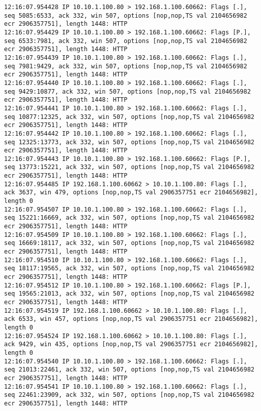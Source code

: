 \documentclass{article}
\begin{document}
{\begin{lstlisting}
12:16:07.954428 IP 10.10.1.100.80 > 192.168.1.100.60662: Flags [.], seq 5085:6533, ack 332, win 507, options [nop,nop,TS val 2104656982 ecr 2906357751], length 1448: HTTP
12:16:07.954429 IP 10.10.1.100.80 > 192.168.1.100.60662: Flags [P.], seq 6533:7981, ack 332, win 507, options [nop,nop,TS val 2104656982 ecr 2906357751], length 1448: HTTP
12:16:07.954439 IP 10.10.1.100.80 > 192.168.1.100.60662: Flags [.], seq 7981:9429, ack 332, win 507, options [nop,nop,TS val 2104656982 ecr 2906357751], length 1448: HTTP
12:16:07.954440 IP 10.10.1.100.80 > 192.168.1.100.60662: Flags [.], seq 9429:10877, ack 332, win 507, options [nop,nop,TS val 2104656982 ecr 2906357751], length 1448: HTTP
12:16:07.954441 IP 10.10.1.100.80 > 192.168.1.100.60662: Flags [.], seq 10877:12325, ack 332, win 507, options [nop,nop,TS val 2104656982 ecr 2906357751], length 1448: HTTP
12:16:07.954442 IP 10.10.1.100.80 > 192.168.1.100.60662: Flags [.], seq 12325:13773, ack 332, win 507, options [nop,nop,TS val 2104656982 ecr 2906357751], length 1448: HTTP
12:16:07.954443 IP 10.10.1.100.80 > 192.168.1.100.60662: Flags [P.], seq 13773:15221, ack 332, win 507, options [nop,nop,TS val 2104656982 ecr 2906357751], length 1448: HTTP
12:16:07.954485 IP 192.168.1.100.60662 > 10.10.1.100.80: Flags [.], ack 3637, win 479, options [nop,nop,TS val 2906357751 ecr 2104656982], length 0
12:16:07.954507 IP 10.10.1.100.80 > 192.168.1.100.60662: Flags [.], seq 15221:16669, ack 332, win 507, options [nop,nop,TS val 2104656982 ecr 2906357751], length 1448: HTTP
12:16:07.954509 IP 10.10.1.100.80 > 192.168.1.100.60662: Flags [.], seq 16669:18117, ack 332, win 507, options [nop,nop,TS val 2104656982 ecr 2906357751], length 1448: HTTP
12:16:07.954510 IP 10.10.1.100.80 > 192.168.1.100.60662: Flags [.], seq 18117:19565, ack 332, win 507, options [nop,nop,TS val 2104656982 ecr 2906357751], length 1448: HTTP
12:16:07.954512 IP 10.10.1.100.80 > 192.168.1.100.60662: Flags [P.], seq 19565:21013, ack 332, win 507, options [nop,nop,TS val 2104656982 ecr 2906357751], length 1448: HTTP
12:16:07.954519 IP 192.168.1.100.60662 > 10.10.1.100.80: Flags [.], ack 6533, win 457, options [nop,nop,TS val 2906357751 ecr 2104656982], length 0
12:16:07.954524 IP 192.168.1.100.60662 > 10.10.1.100.80: Flags [.], ack 9429, win 435, options [nop,nop,TS val 2906357751 ecr 2104656982], length 0
12:16:07.954540 IP 10.10.1.100.80 > 192.168.1.100.60662: Flags [.], seq 21013:22461, ack 332, win 507, options [nop,nop,TS val 2104656982 ecr 2906357751], length 1448: HTTP
12:16:07.954541 IP 10.10.1.100.80 > 192.168.1.100.60662: Flags [.], seq 22461:23909, ack 332, win 507, options [nop,nop,TS val 2104656982 ecr 2906357751], length 1448: HTTP

\end{lstlisting}}
\end{document}

